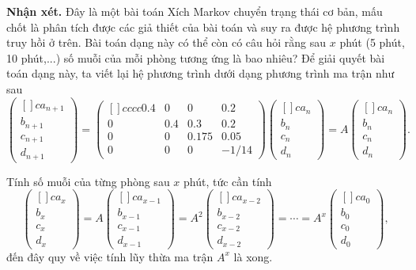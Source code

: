 \textbf{Nhận xét. }Đây là một bài toán Xích Markov chuyển trạng thái cơ bản, mấu chốt là phân tích được các giả thiết của bài toán và suy ra được hệ phương trình truy hồi ở trên. Bài toán dạng này có thể còn có câu hỏi rằng sau $x$ phút (5 phút, 10 phút,...) số muỗi của mỗi phòng tương ứng là bao nhiêu? Để giải quyết bài toán dạng này, ta viết lại hệ phương trình dưới dạng phương trình ma trận như sau 
$$\begin{pmatrix}[]{c}
    a_{n+1} \\ b_{n+1} \\ c_{n+1} \\ d_{n+1}
\end{pmatrix} = \begin{pmatrix}[]{cccc}
    0.4 & 0 & 0 & 0.2 \\
    0 & 0.4 & 0.3 & 0.2 \\
    0 & 0 & 0.175 & 0.05 \\
    0 & 0 & 0 & -1/14 
\end{pmatrix}\begin{pmatrix}[]{c}
    a_{n} \\ b_{n} \\ c_{n} \\ d_{n}
\end{pmatrix} = A\begin{pmatrix}[]{c}
    a_{n} \\ b_{n} \\ c_{n} \\ d_{n}
\end{pmatrix}.$$

Tính số muỗi của từng phòng sau $x$ phút, tức cần tính $$\begin{pmatrix}[]{c}
    a_{x} \\ b_{x} \\ c_{x} \\ d_{x}
\end{pmatrix} = A\begin{pmatrix}[]{c}
    a_{x-1} \\ b_{x-1} \\ c_{x-1} \\ d_{x-1}
\end{pmatrix} = A^2\begin{pmatrix}[]{c}
    a_{x-2} \\ b_{x-2} \\ c_{x-2} \\ d_{x-2}
\end{pmatrix} = \cdots = A^x\begin{pmatrix}[]{c}
    a_{0} \\ b_{0} \\ c_{0} \\ d_{0}
\end{pmatrix},$$ đến đây quy về việc tính lũy thừa ma trận $A^x$ là xong.

